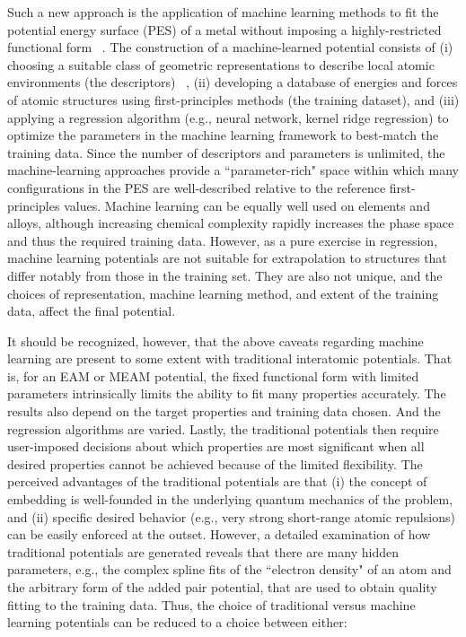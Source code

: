\documentclass{article}
\begin{document}
Such a new approach is the application of machine learning methods to fit the potential energy surface (PES)
of a metal without imposing a highly-restricted functional form ~\cite{Bartok2013,Behler2015,Kobayashi2017,PurjaPun0PhysicallyMaterials,Wang2018}.
The construction of a machine-learned potential consists of (i) choosing a suitable class of geometric representations to describe local atomic environments (the descriptors) ~\cite{Behler2007,Rogers2010Extended-connectivityFingerprints,Bartok2015,Faber2017PredictionError}, (ii) developing a database of energies and forces of atomic structures using first-principles methods (the training dataset), and (iii) applying a regression algorithm (e.g., neural network, kernel ridge regression) to optimize the parameters in the machine learning framework to best-match the training data.
Since the number of descriptors and parameters is unlimited, the machine-learning approaches provide a ``parameter-rich" space within which many configurations in the PES are well-described relative to the reference first-principles values.
Machine learning can be equally well used on elements and alloys, although increasing chemical complexity rapidly increases the phase space and thus the required training data.
However, as a pure exercise in regression, machine learning potentials are not suitable for extrapolation to structures that differ notably from those in the training set.
They are also not unique, and the choices of representation, machine learning method, and extent of the training data, affect the final potential.  

It should be recognized, however, that the above caveats regarding machine learning are present to some extent with traditional interatomic potentials.
That is, for an EAM or MEAM potential, the fixed functional form with limited parameters intrinsically limits the ability to fit many properties accurately.
The results also depend on the target properties and training data chosen.
And the regression algorithms are varied.
Lastly, the traditional potentials then require user-imposed decisions about which properties are most significant when all desired properties cannot be achieved because of the limited flexibility.
The perceived advantages of the traditional potentials are that (i) the concept of embedding is well-founded in the underlying quantum mechanics of the problem, and (ii) specific desired behavior (e.g., very strong short-range atomic repulsions) can be easily enforced at the outset.
However, a detailed examination of how traditional potentials are generated reveals that there are many hidden parameters, e.g., the complex spline fits of the ``electron density" of an atom and the arbitrary form of the added pair potential, that are used to obtain quality fitting to the training data.
Thus, the choice of traditional versus machine learning potentials can be reduced to a choice between either:
\end{document}
